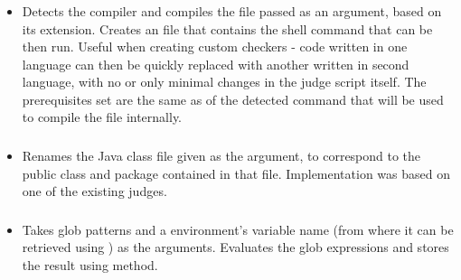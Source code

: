 \subsubsection*{}\label{subsec:AutoCompile}

\begin{itemize}[label={}]
    \item Detects the compiler and compiles the file passed as an argument, based on its extension.
          Creates an  file that contains the shell command that can be then run.
          Useful when creating custom checkers - code written in one language can then be quickly replaced with another
          written in second language, with no or only minimal changes in the judge script itself.
          The prerequisites set are the same as of the detected command that will be used to compile the file
          internally.
\end{itemize}

\subsubsection*{}\label{subsec:RenameJavaFile}

\begin{itemize}[label={}]
    \item Renames the Java class file given as the argument, to correspond to the public class and package contained in
          that file.
          Implementation was based on one of the existing judges.
\end{itemize}

\subsubsection*{}\label{subsec:ListFiles}

\begin{itemize}[label={}]
    \item Takes glob patterns and a environment's variable name (from where it can be retrieved using
          \hyperref[sec:DependentExpr]{}) as the arguments.
          Evaluates the glob expressions and stores the result using
          \hyperref[sec:set_variable]{} method.
\end{itemize}

\subsubsection*{}\label{subsec:CreateUser}

